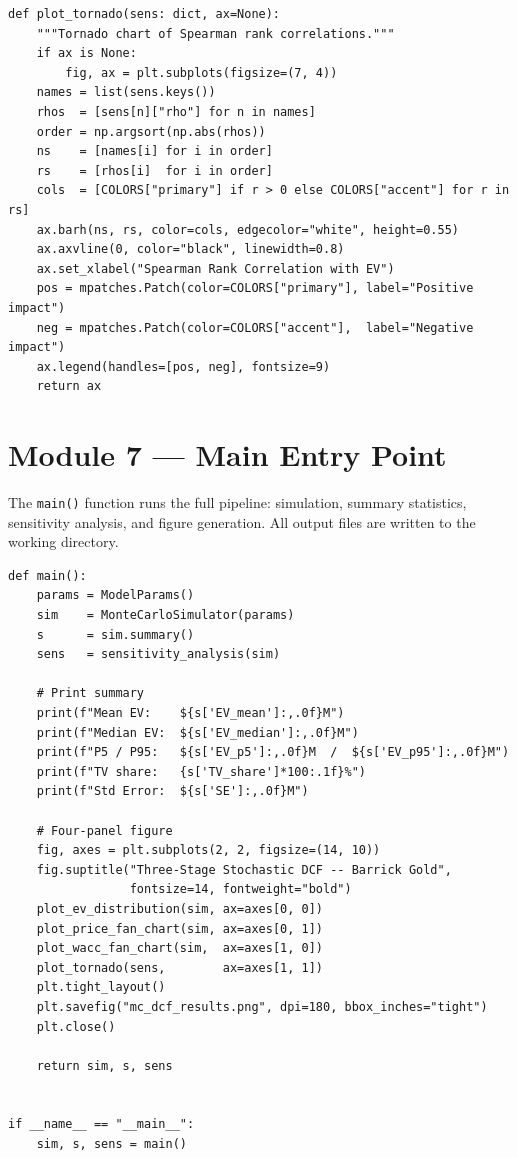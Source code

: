 \begin{lstlisting}[style=python, caption={Visualisation functions — EV distribution, fan charts, tornado}]
def plot_tornado(sens: dict, ax=None):
    """Tornado chart of Spearman rank correlations."""
    if ax is None:
        fig, ax = plt.subplots(figsize=(7, 4))
    names = list(sens.keys())
    rhos  = [sens[n]["rho"] for n in names]
    order = np.argsort(np.abs(rhos))
    ns    = [names[i] for i in order]
    rs    = [rhos[i]  for i in order]
    cols  = [COLORS["primary"] if r > 0 else COLORS["accent"] for r in rs]
    ax.barh(ns, rs, color=cols, edgecolor="white", height=0.55)
    ax.axvline(0, color="black", linewidth=0.8)
    ax.set_xlabel("Spearman Rank Correlation with EV")
    pos = mpatches.Patch(color=COLORS["primary"], label="Positive impact")
    neg = mpatches.Patch(color=COLORS["accent"],  label="Negative impact")
    ax.legend(handles=[pos, neg], fontsize=9)
    return ax
\end{lstlisting}

\section*{Module 7 — Main Entry Point}

The \texttt{main()} function runs the full pipeline: simulation,
summary statistics, sensitivity analysis, and figure generation. All
output files are written to the working directory.

\begin{lstlisting}[style=python, caption={Main entry point — full pipeline execution}]
def main():
    params = ModelParams()
    sim    = MonteCarloSimulator(params)
    s      = sim.summary()
    sens   = sensitivity_analysis(sim)

    # Print summary
    print(f"Mean EV:    ${s['EV_mean']:,.0f}M")
    print(f"Median EV:  ${s['EV_median']:,.0f}M")
    print(f"P5 / P95:   ${s['EV_p5']:,.0f}M  /  ${s['EV_p95']:,.0f}M")
    print(f"TV share:   {s['TV_share']*100:.1f}%")
    print(f"Std Error:  ${s['SE']:,.0f}M")

    # Four-panel figure
    fig, axes = plt.subplots(2, 2, figsize=(14, 10))
    fig.suptitle("Three-Stage Stochastic DCF -- Barrick Gold",
                 fontsize=14, fontweight="bold")
    plot_ev_distribution(sim, ax=axes[0, 0])
    plot_price_fan_chart(sim, ax=axes[0, 1])
    plot_wacc_fan_chart(sim,  ax=axes[1, 0])
    plot_tornado(sens,        ax=axes[1, 1])
    plt.tight_layout()
    plt.savefig("mc_dcf_results.png", dpi=180, bbox_inches="tight")
    plt.close()

    return sim, s, sens


if __name__ == "__main__":
    sim, s, sens = main()
\end{lstlisting}
